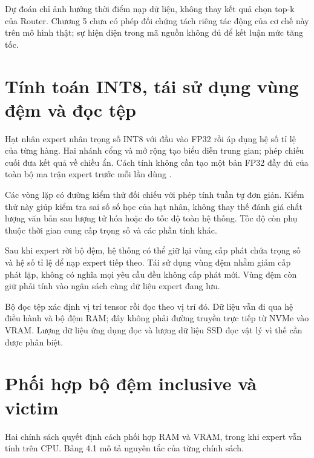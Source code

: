 Dự đoán chỉ ảnh hưởng thời điểm nạp dữ liệu, không thay kết quả chọn top-k của Router. Chương 5 chưa có phép đối chứng tách riêng tác động của cơ chế này trên mô hình thật; sự hiện diện trong mã nguồn không đủ để kết luận mức tăng tốc.

\section{Tính toán INT8, tái sử dụng vùng đệm và đọc tệp}

Hạt nhân expert nhân trọng số INT8 với đầu vào FP32 rồi áp dụng hệ số tỉ lệ của từng hàng. Hai nhánh cổng và mở rộng tạo biểu diễn trung gian; phép chiếu cuối đưa kết quả về chiều ẩn. Cách tính không cần tạo một bản FP32 đầy đủ của toàn bộ ma trận expert trước mỗi lần dùng \cite{moe_tierengine_arch}.

Các vòng lặp có đường kiểm thử đối chiếu với phép tính tuần tự đơn giản. Kiểm thử này giúp kiểm tra sai số số học của hạt nhân, không thay thế đánh giá chất lượng văn bản sau lượng tử hóa hoặc đo tốc độ toàn hệ thống. Tốc độ còn phụ thuộc thời gian cung cấp trọng số và các phần tính khác.

Sau khi expert rời bộ đệm, hệ thống có thể giữ lại vùng cấp phát chứa trọng số và hệ số tỉ lệ để nạp expert tiếp theo. Tái sử dụng vùng đệm nhằm giảm cấp phát lặp, không có nghĩa mọi yêu cầu đều không cấp phát mới. Vùng đệm còn giữ phải tính vào ngân sách cùng dữ liệu expert đang lưu.

Bộ đọc tệp xác định vị trí tensor rồi đọc theo vị trí đó. Dữ liệu vẫn đi qua hệ điều hành và bộ đệm RAM; đây không phải đường truyền trực tiếp từ NVMe vào VRAM. Lượng dữ liệu ứng dụng đọc và lượng dữ liệu SSD đọc vật lý vì thế cần được phân biệt.

\section{Phối hợp bộ đệm inclusive và victim}

Hai chính sách quyết định cách phối hợp RAM và VRAM, trong khi expert vẫn tính trên CPU. Bảng 4.1 mô tả nguyên tắc của từng chính sách.

